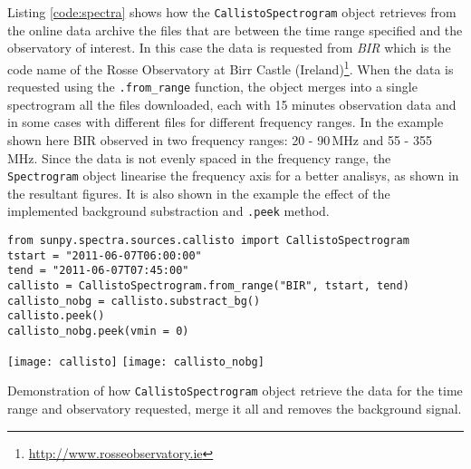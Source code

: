 Listing \ref{code:spectra} shows how the \texttt{CallistoSpectrogram} object retrieves
from the online data archive the files that are between the time range specified and
the observatory of interest.  In this case the data is requested from \textit{BIR} which is the code name of the
Rosse Observatory at Birr Castle (Ireland)\footnote{\url{http://www.rosseobservatory.ie}}.
When the data is requested using the \texttt{.from\_range} function, the object merges
into a single spectrogram all the files downloaded, each with 15 minutes observation data 
and in some cases with different files for different frequency ranges.  
In the example shown here BIR observed in two frequency ranges: 20 - 90\,MHz and 55 - 355\,MHz.
Since the data is not evenly spaced in the frequency range, the \texttt{Spectrogram} object
linearise the frequency axis for a better analisys, as shown in the resultant figures.
It is also shown in the example the effect of the implemented background substraction and
\texttt{.peek} method.

\begin{listing}[H]
\begin{verbatim}
from sunpy.spectra.sources.callisto import CallistoSpectrogram
tstart = "2011-06-07T06:00:00"
tend = "2011-06-07T07:45:00"
callisto = CallistoSpectrogram.from_range("BIR", tstart, tend)
callisto_nobg = callisto.substract_bg()
callisto.peek()
callisto_nobg.peek(vmin = 0)
\end{verbatim}
\texttt{[image: callisto]} %
\texttt{[image: callisto\_nobg]}
\caption{Demonstration of how \texttt{CallistoSpectrogram} object retrieve the data
for the time range and observatory requested, merge it all and removes the background
signal.}
\label{code:spectra}
\end{listing}


